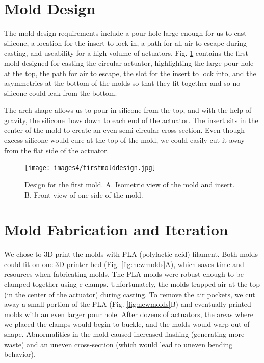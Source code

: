 \section{Mold Design}

The mold design requirements include a pour hole large enough for us to cast silicone, a location for the insert to lock in, a path for all air to escape during casting, and useability for a high volume of actuators. Fig. \ref{fig:firstmold} contains the first mold designed for casting the circular actuator, highlighting the large pour hole at the top, the path for air to escape, the slot for the insert to lock into, and the asymmetries at the bottom of the molds so that they fit together and so no silicone could leak from the bottom. 

The arch shape allows us to pour in silicone from the top, and with the help of gravity, the silicone flows down to each end of the actuator. The insert sits in the center of the mold to create an even semi-circular cross-section. Even though excess silicone would cure at the top of the mold, we could easily cut it away from the flat side of the actuator. 

\begin{figure}[!ht]
    \centering
    \texttt{[image: images4/firstmolddesign.jpg]}
    \caption{Design for the first mold. A. Isometric view of the mold and insert. B. Front view of one side of the mold.}
    \label{fig:firstmold}
\end{figure}

\section{Mold Fabrication and Iteration}

We chose to 3D-print the molds with PLA (polylactic acid) filament. Both molds could fit on one 3D-printer bed (Fig. \ref{fig:newmolds}A), which saves time and resources when fabricating molds. The PLA molds were robust enough to be clamped together using c-clamps. Unfortunately, the molds trapped air at the top (in the center of the actuator) during casting. To remove the air pockets, we cut away a small portion of the PLA (Fig. \ref{fig:newmolds}B) and eventually printed molds with an even larger pour hole. After dozens of actuators, the areas where we placed the clamps would begin to buckle, and the molds would warp out of shape. Abnormalities in the mold caused increased flashing (generating more waste) and an uneven cross-section (which would lead to uneven bending behavior). 


